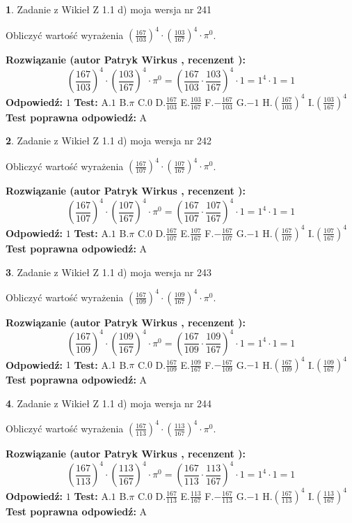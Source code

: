 \documentclass[12pt, a4paper]{article}
\theoremstyle{definition} %
\newtheorem{zad}{}
\newcommand{\zadStart}[1]{\begin{zad}#1\newline}
\newcommand{\zadStop}{\end{zad}}
\newcommand{\rozwStart}[2]{\noindent \textbf{Rozwiązanie (autor #1 , recenzent #2): }\newline}
\newcommand{\rozwStop}{\newline}
\newcommand{\odpStart}{\noindent \textbf{Odpowiedź:}\newline}
\newcommand{\odpStop}{\newline}
\newcommand{\testStart}{\noindent \textbf{Test:}\newline}
\newcommand{\testStop}{\newline}
\newcommand{\kluczStart}{\noindent \textbf{Test poprawna odpowiedź:}\newline}
\newcommand{\kluczStop}{\newline}
\begin{document}
\zadStart{Zadanie z Wikieł Z 1.1 d) moja wersja nr 241}

Obliczyć wartość wyrażenia $(\frac{167}{103})^{4} \cdot (\frac{103}{167})^{4} \cdot \pi^{0}$.
\zadStop
\rozwStart{Patryk Wirkus}{}
$$(\frac{167}{103})^{4} \cdot (\frac{103}{167})^{4} \cdot \pi^{0} = (\frac{167}{103} \cdot \frac{103}{167})^{4} \cdot 1 = 1^{4} \cdot 1 = 1$$
\rozwStop
\odpStart
$1$
\odpStop
\testStart
A.$1$ B.$\pi$ C.$0$ D.$\frac{167}{103}$ E.$\frac{103}{167}$
F.$-\frac{167}{103}$ G.$-1$
H.$(\frac{167}{103})^{4}$
I.$(\frac{103}{167})^{4}$
\testStop
\kluczStart
A
\kluczStop



\zadStart{Zadanie z Wikieł Z 1.1 d) moja wersja nr 242}

Obliczyć wartość wyrażenia $(\frac{167}{107})^{4} \cdot (\frac{107}{167})^{4} \cdot \pi^{0}$.
\zadStop
\rozwStart{Patryk Wirkus}{}
$$(\frac{167}{107})^{4} \cdot (\frac{107}{167})^{4} \cdot \pi^{0} = (\frac{167}{107} \cdot \frac{107}{167})^{4} \cdot 1 = 1^{4} \cdot 1 = 1$$
\rozwStop
\odpStart
$1$
\odpStop
\testStart
A.$1$ B.$\pi$ C.$0$ D.$\frac{167}{107}$ E.$\frac{107}{167}$
F.$-\frac{167}{107}$ G.$-1$
H.$(\frac{167}{107})^{4}$
I.$(\frac{107}{167})^{4}$
\testStop
\kluczStart
A
\kluczStop



\zadStart{Zadanie z Wikieł Z 1.1 d) moja wersja nr 243}

Obliczyć wartość wyrażenia $(\frac{167}{109})^{4} \cdot (\frac{109}{167})^{4} \cdot \pi^{0}$.
\zadStop
\rozwStart{Patryk Wirkus}{}
$$(\frac{167}{109})^{4} \cdot (\frac{109}{167})^{4} \cdot \pi^{0} = (\frac{167}{109} \cdot \frac{109}{167})^{4} \cdot 1 = 1^{4} \cdot 1 = 1$$
\rozwStop
\odpStart
$1$
\odpStop
\testStart
A.$1$ B.$\pi$ C.$0$ D.$\frac{167}{109}$ E.$\frac{109}{167}$
F.$-\frac{167}{109}$ G.$-1$
H.$(\frac{167}{109})^{4}$
I.$(\frac{109}{167})^{4}$
\testStop
\kluczStart
A
\kluczStop



\zadStart{Zadanie z Wikieł Z 1.1 d) moja wersja nr 244}

Obliczyć wartość wyrażenia $(\frac{167}{113})^{4} \cdot (\frac{113}{167})^{4} \cdot \pi^{0}$.
\zadStop
\rozwStart{Patryk Wirkus}{}
$$(\frac{167}{113})^{4} \cdot (\frac{113}{167})^{4} \cdot \pi^{0} = (\frac{167}{113} \cdot \frac{113}{167})^{4} \cdot 1 = 1^{4} \cdot 1 = 1$$
\rozwStop
\odpStart
$1$
\odpStop
\testStart
A.$1$ B.$\pi$ C.$0$ D.$\frac{167}{113}$ E.$\frac{113}{167}$
F.$-\frac{167}{113}$ G.$-1$
H.$(\frac{167}{113})^{4}$
I.$(\frac{113}{167})^{4}$
\testStop
\kluczStart
A
\kluczStop
\end{document}
